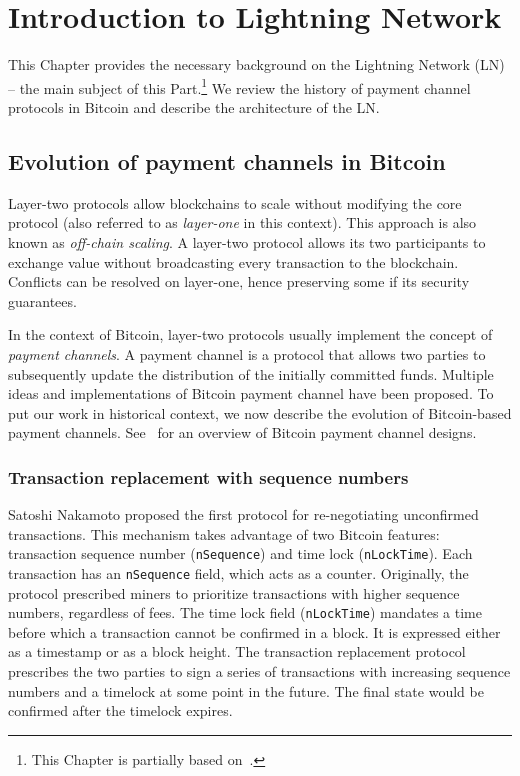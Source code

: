 \chapter{Introduction to Lightning Network}

\label{Chapter05IntroLightning}

This Chapter provides the necessary background on the Lightning Network (LN) -- the main subject of this Part.\footnote{This Chapter is partially based on~\cite{Tikhomirov2020a}.}
We review the history of payment channel protocols in Bitcoin and describe the architecture of the LN.


\section{Evolution of payment channels in Bitcoin}

Layer-two protocols allow blockchains to scale without modifying the core protocol (also referred to as \textit{layer-one} in this context).
This approach is also known as \textit{off-chain scaling}.
A layer-two protocol allows its two participants to exchange value without broadcasting every transaction to the blockchain.
Conflicts can be resolved on layer-one, hence preserving some if its security guarantees.

In the context of Bitcoin, layer-two protocols usually implement the concept of \textit{payment channels}.
A payment channel is a protocol that allows two parties to subsequently update the distribution of the initially committed funds.
Multiple ideas and implementations of Bitcoin payment channel have been proposed.
To put our work in historical context, we now describe the evolution of Bitcoin-based payment channels.
See~\cite{McCorry2016} for an overview of Bitcoin payment channel designs.


\subsection{Transaction replacement with sequence numbers}

Satoshi Nakamoto proposed the first protocol for re-negotiating unconfirmed transactions.
This mechanism takes advantage of two Bitcoin features: transaction sequence number (\texttt{nSequence}) and time lock (\texttt{nLockTime}).
Each transaction has an \texttt{nSequence} field, which acts as a counter.
Originally, the protocol prescribed miners to prioritize transactions with higher sequence numbers, regardless of fees.
The time lock field (\texttt{nLockTime}) mandates a time before which a transaction cannot be confirmed in a block.
It is expressed either as a timestamp or as a block height.
The transaction replacement protocol prescribes the two parties to sign a series of transactions with increasing sequence numbers and a timelock at some point in the future.
The final state would be confirmed after the timelock expires.


